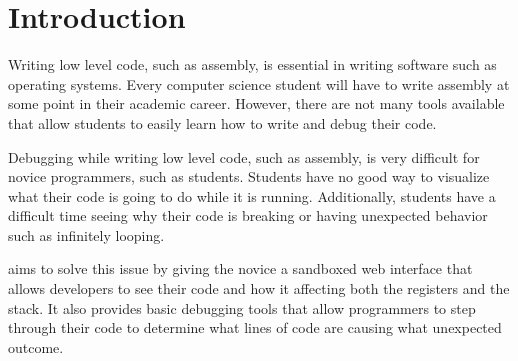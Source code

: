 


\section{Introduction}

Writing low level code, such as assembly, is essential in writing software such as operating systems.
%
Every computer science student will have to write assembly at some point in their academic career.
%
However, there are not many tools available that allow students to easily learn how to write and debug their code.




Debugging while writing low level code, such as assembly, is very difficult for novice programmers, such as students.
%
Students have no good way to visualize what their code is going to do while it is running.
%
Additionally, students have a difficult time seeing why their code is breaking or having unexpected behavior such as infinitely looping.



\tool{} aims to solve this issue by giving the novice a sandboxed web interface that allows developers to see their code and how it affecting both the registers and the stack.
%
It also provides basic debugging tools that allow programmers to step through their code to determine what lines of code are causing what unexpected outcome.